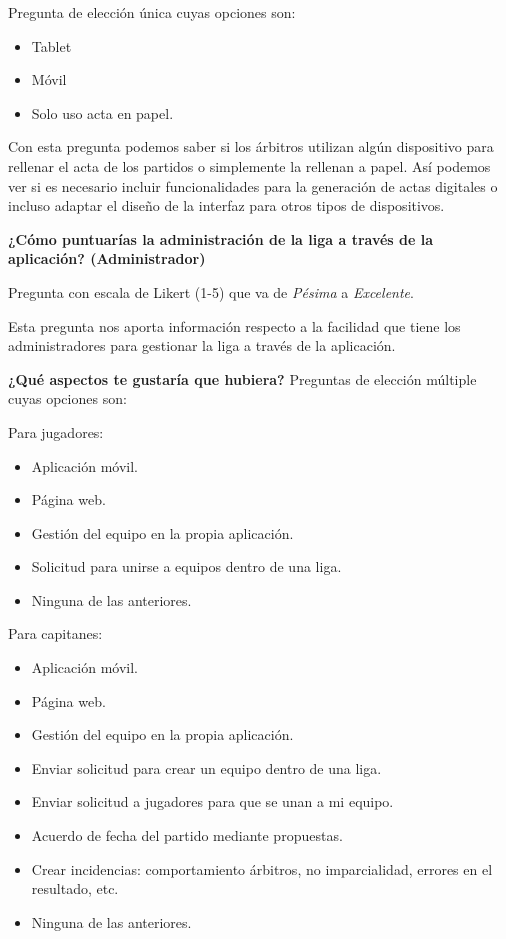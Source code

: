 Pregunta de elección única cuyas opciones son:

\begin{itemize}
    \item Tablet
    \item Móvil
    \item Solo uso acta en papel.
\end{itemize}

Con esta pregunta podemos saber si los árbitros utilizan algún dispositivo para rellenar el acta de los partidos o simplemente la rellenan a papel. Así podemos ver si es necesario incluir funcionalidades para la generación de actas digitales o incluso adaptar el diseño de la interfaz para otros tipos de dispositivos.

\textbf{¿Cómo puntuarías la administración de la liga a través de la aplicación? (Administrador)}

Pregunta con escala de Likert (1-5) que va de \emph{Pésima} a \emph{Excelente}.

Esta pregunta nos aporta información respecto a la facilidad que tiene los administradores para gestionar la liga a través de la aplicación.

\textbf{¿Qué aspectos te gustaría que hubiera?}
Preguntas de elección múltiple cuyas opciones son:

Para jugadores:
\begin{itemize}
    \item Aplicación móvil.
    \item Página web.
    \item Gestión del equipo en la propia aplicación.
    \item Solicitud para unirse a equipos dentro de una liga.
    \item Ninguna de las anteriores.
\end{itemize}

Para capitanes:
\begin{itemize}
    \item Aplicación móvil.
    \item Página web.
    \item Gestión del equipo en la propia aplicación.
    \item Enviar solicitud para crear un equipo dentro de una liga.
    \item Enviar solicitud a jugadores  para que se unan a mi equipo.
    \item Acuerdo de fecha del partido mediante propuestas.
    \item Crear incidencias: comportamiento árbitros, no imparcialidad, errores en el resultado, etc.
    \item Ninguna de las anteriores.
\end{itemize}


